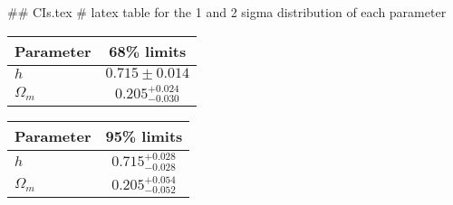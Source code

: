 ## CIs.tex
# latex table for the 1 and 2 sigma distribution of each parameter

\begin{tabular} { l  c}
 Parameter &  68\% limits\\
\hline
{\boldmath$h              $} & $0.715\pm 0.014            $\\
{\boldmath$\Omega_m       $} & $0.205^{+0.024}_{-0.030}   $\\
\hline
\end{tabular}

\begin{tabular} { l  c}
 Parameter &  95\% limits\\
\hline
{\boldmath$h              $} & $0.715^{+0.028}_{-0.028}   $\\
{\boldmath$\Omega_m       $} & $0.205^{+0.054}_{-0.052}   $\\
\hline
\end{tabular}
